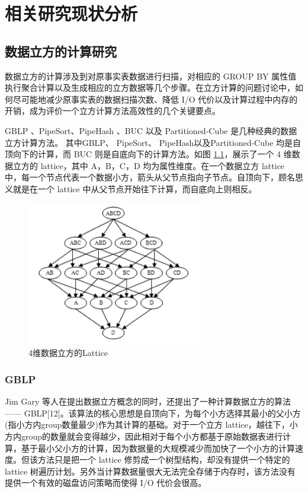 \chapter{相关研究现状分析}


\section{数据立方的计算研究}

数据立方的计算涉及到对原事实表数据进行扫描，对相应的 GROUP BY 属性值执行聚合计算以及生成相应的立方数据等几个步骤。在立方计算的问题讨论中，如何尽可能地减少原事实表的数据扫描次数、降低 I/O 代价以及计算过程中内存的开销，成为评价一个立方计算方法高效性的几个关键要点。

GBLP \cite{gray1997data}、PipeSort、PipeHash \cite{agarwal1996computation}、BUC \cite{beyer1999bottom} 以及 Partitioned-Cube \cite{ross1997fast} 是几种经典的数据立方计算方法。 其中GBLP、 PipeSort、 PipeHash以及Partitioned-Cube 均是自顶向下的计算，而 BUC 则是自底向下的计算方法。如图 \ref{4_dimension_lattice}，展示了一个 4 维数据立方的 lattice，其中 A，B，C，D 均为属性维度。在一个数据立方 lattice 中，每一个节点代表一个数据小方，箭头从父节点指向子节点。自顶向下，顾名思义就是在一个 lattice 中从父节点开始往下计算，而自底向上则相反。

\begin{figure}[!htb]
\centering\includegraphics[width=3in]{picture/ch_current_research/4_dimension_lattice} 
\caption{4维数据立方的Lattice}\label{4_dimension_lattice} 
\end{figure} 

\subsection{GBLP}

Jim Gary 等人在提出数据立方概念的同时，还提出了一种计算数据立方的算法 —— GBLP[12]。该算法的核心思想是自顶向下，为每个小方选择其最小的父小方(指小方内group数量最少)作为其计算的基础。对于一个立方 lattice，越往下，小方内group的数量就会变得越少，因此相对于每个小方都基于原始数据表进行计算，基于最小父小方的计算，因为数据量的大规模减少而加快了一个小方的计算速度。但该方法只是把一个 lattice 修剪成一个树型结构，却没有提供一个特定的 lattice 树遍历计划。另外当计算数据量很大无法完全存储于内存时，该方法没有提供一个有效的磁盘访问策略而使得 I/O 代价会很高。

